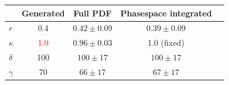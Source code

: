 \documentclass{beamer}
\begin{document}
\begin{frame}[plain]
	\begin{table}[h]
  \scriptsize
  \centering
  \begin{tabular}
    {l c c c c}
    \hline \hline
    & Generated &  Full PDF        &   Phasespace integrated  \\   \hline
	$r$ & 0.4 & $0.42 \pm 0.09$    &  $0.39 \pm 0.09$ \\
	$\kappa$  & \textcolor{red}{1.0} & $0.96 \pm 0.03$ &  1.0 (fixed)  \\
	$\delta$ & 100 & $100 \pm 17$ &  $100 \pm 17$  \\
	$\gamma$ & 70 & $66 \pm 17$ & $67 \pm 17$  \\
    \hline \hline
  \end{tabular}
\end{table}

\end{frame}
	
\end{document}
